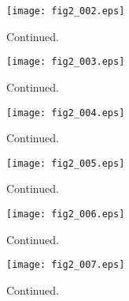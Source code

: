 \documentclass[preprint]{aastex}
\begin{document}
\setcounter{figure}{1}
\begin{figure}[t]
\centering
\texttt{[image: fig2\_002.eps]}
\caption{
Continued. 
}
\label{Fig2}
\end{figure}
\clearpage



\setcounter{figure}{1}
\begin{figure}[t]
\centering
\texttt{[image: fig2\_003.eps]}
\caption{
Continued. 
}
\label{Fig2}
\end{figure}
\clearpage


\setcounter{figure}{1}
\begin{figure}[t]
\centering
\texttt{[image: fig2\_004.eps]}
\caption{
Continued. 
}
\label{Fig2}
\end{figure}
\clearpage


\setcounter{figure}{1}
\begin{figure}[t]
\centering
\texttt{[image: fig2\_005.eps]}
\caption{
Continued. 
}
\label{Fig2}
\end{figure}
\clearpage



\setcounter{figure}{1}
\begin{figure}[t]
\centering
\texttt{[image: fig2\_006.eps]}
\caption{
Continued. 
}
\label{Fig2}
\end{figure}
\clearpage



\setcounter{figure}{1}
\begin{figure}[t]
\centering
\texttt{[image: fig2\_007.eps]}
\caption{
Continued. 
}
\label{Fig2}
\end{figure}
\clearpage
\end{document}
